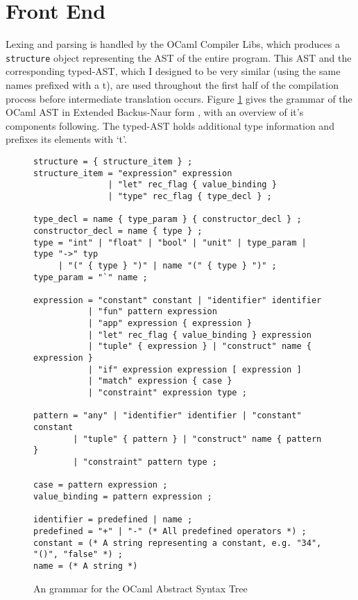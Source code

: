 \documentclass[12pt,twoside,notitlepage]{report}
\newcommand{\textinline}{\texttt}
\begin{document}



\section{Front End}
Lexing and parsing is handled by the OCaml Compiler Libs, which produces a \textinline{structure} object representing the AST of the entire program. This AST and the corresponding typed-AST, which I designed to be very similar (using the same names prefixed with a t), are used throughout the first half of the compilation process before intermediate translation occurs. Figure \ref{fig:ast} gives the grammar of the OCaml AST in Extended Backus-Naur form \cite{Ebnf}, with an overview of it's components following. The typed-AST holds additional type information and prefixes its elements with `t'.
\begin{figure}[h!]
	\begin{verbatim}
structure = { structure_item } ;
structure_item = "expression" expression
               | "let" rec_flag { value_binding }
               | "type" rec_flag { type_decl } ;

type_decl = name { type_param } { constructor_decl } ;
constructor_decl = name { type } ;
type = "int" | "float" | "bool" | "unit" | type_param | type "->" typ
     | "(" { type } ")" | name "(" { type } ")" ;
type_param = "`" name ;

expression = "constant" constant | "identifier" identifier
           | "fun" pattern expression
           | "app" expression { expression }
           | "let" rec_flag { value_binding } expression
           | "tuple" { expression } | "construct" name { expression }
           | "if" expression expression [ expression ]
           | "match" expression { case }
           | "constraint" expression type ;
           
pattern = "any" | "identifier" identifier | "constant" constant
        | "tuple" { pattern } | "construct" name { pattern }
        | "constraint" pattern type ;
        
case = pattern expression ;
value_binding = pattern expression ;
           
identifier = predefined | name ;
predefined = "+" | "-" (* All predefined operators *) ;
constant = (* A string representing a constant, e.g. "34", "()", "false" *) ;
name = (* A string *)
	\end{verbatim}
	\caption{An grammar for the OCaml Abstract Syntax Tree}
	\label{fig:ast}
\end{figure}
\end{document}

